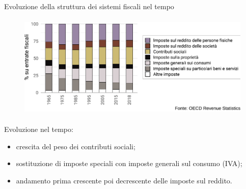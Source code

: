 \documentclass[aspectratio=64,12pt]{beamer}
\begin{document}
\begin{frame}{Evoluzione della struttura dei sistemi fiscali nel tempo}
\begin{figure}[htbp]
\centering
\includegraphics[height=5cm]{./figure/evoluzione-composizione-entrate-OCSE-color.pdf}
\end{figure}

Evoluzione nel tempo:
\begin{itemize}
\item crescita del peso dei contributi sociali;
\item sostituzione di imposte speciali con imposte generali sul consumo (IVA);
\item andamento prima crescente poi decrescente delle imposte sul reddito.
\end{itemize}
\end{frame}
\end{document}
